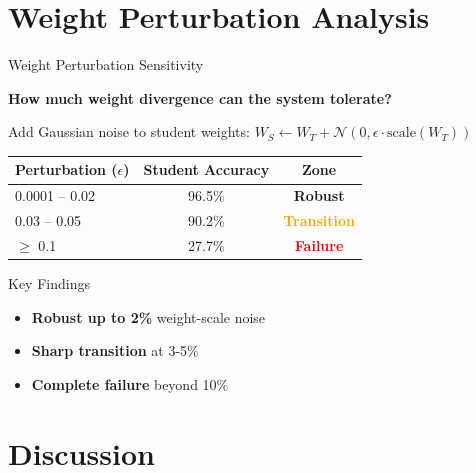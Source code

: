 \documentclass{beamer}
\begin{document}
\section{Weight Perturbation Analysis}

\begin{frame}{Weight Perturbation Sensitivity}

\textbf{How much weight divergence can the system tolerate?}

\vspace{0.5em}

Add Gaussian noise to student weights: $W_S \gets W_T + \mathcal{N}(0, \epsilon \cdot \text{scale}(W_T))$

\vspace{1em}

\begin{table}
\centering
\small
\begin{tabular}{lcc}
\toprule
Perturbation ($\epsilon$) & Student Accuracy & Zone \\
\midrule
0.0001 -- 0.02 & 96.5\% & \textcolor{green!60!black}{\textbf{Robust}} \\
0.03 -- 0.05 & 90.2\% & \textcolor{orange}{\textbf{Transition}} \\
$\geq$ 0.1 & 27.7\% & \textcolor{red}{\textbf{Failure}} \\
\bottomrule
\end{tabular}
\end{table}

\vspace{1em}

\begin{block}{Key Findings}
\begin{itemize}
    \item \textbf{Robust up to 2\%} weight-scale noise
    \item \textbf{Sharp transition} at 3-5\%
    \item \textbf{Complete failure} beyond 10\%
\end{itemize}
\end{block}

\end{frame}

\section{Discussion}
\end{document}
